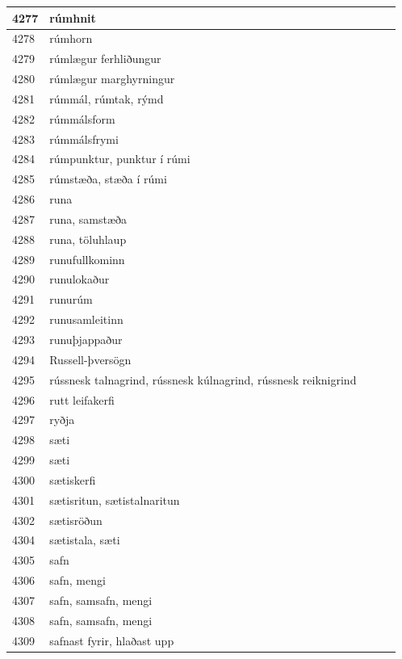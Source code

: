 \begin{longtable}{p{}|p{}|p{}|p{}|p{}}
\hline
4277 & rúmhnit &  &  &  \\
\hline
4278 & rúmhorn &  &  &  \\
\hline
4279 & rúmlægur ferhliðungur &  &  &  \\
\hline
4280 & rúmlægur marghyrningur &  &  &  \\
\hline
4281 & rúmmál, rúmtak, rýmd &  &  &  \\
\hline
4282 & rúmmálsform &  &  &  \\
\hline
4283 & rúmmálsfrymi &  &  &  \\
\hline
4284 & rúmpunktur, punktur í rúmi &  &  &  \\
\hline
4285 & rúmstæða, stæða í rúmi &  &  &  \\
\hline
4286 & runa &  &  &  \\
\hline
4287 & runa, samstæða &  &  &  \\
\hline
4288 & runa, töluhlaup &  &  &  \\
\hline
4289 & runufullkominn &  &  &  \\
\hline
4290 & runulokaður &  &  &  \\
\hline
4291 & runurúm &  &  &  \\
\hline
4292 & runusamleitinn &  &  &  \\
\hline
4293 & runuþjappaður &  &  &  \\
\hline
4294 & Russell-þversögn &  &  &  \\
\hline
4295 & rússnesk talnagrind, rússnesk kúlnagrind, rússnesk reiknigrind &  &  &  \\
\hline
4296 & rutt leifakerfi &  &  &  \\
\hline
4297 & ryðja &  &  &  \\
\hline
4298 & sæti &  &  &  \\
\hline
4299 & sæti &  &  &  \\
\hline
4300 & sætiskerfi &  &  &  \\
\hline
4301 & sætisritun, sætistalnaritun &  &  &  \\
\hline
4302 & sætisröðun &  &  &  \\
\hline
4304 & sætistala, sæti &  &  &  \\
\hline
4305 & safn &  &  &  \\
\hline
4306 & safn, mengi &  &  &  \\
\hline
4307 & safn, samsafn, mengi &  &  &  \\
\hline
4308 & safn, samsafn, mengi &  &  &  \\
\hline
4309 & safnast fyrir, hlaðast upp &  &  &  \\

\end{longtable}
